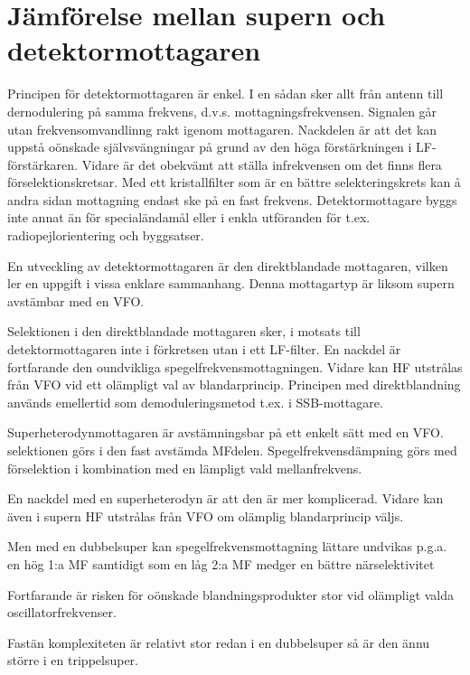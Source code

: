 \section{Jämförelse mellan supern och detektormottagaren}
\label{superheterojämförelse}

Principen för detektormottagaren är enkel. I en sådan sker allt från
antenn till dernodulering på samma frekvens,
d.v.s. mottagningsfrekvensen. Signalen går utan frekvensomvandlinng
rakt igenom mottagaren. Nackdelen är att det kan uppstå oönskade
självsvängningar på grund av den höga förstärkningen i
LF-förstärkaren. Vidare är det obekvämt att ställa infrekvensen om det
finns flera förselektionskretsar. Med ett kristallfilter som är en
bättre selekteringskrets kan å andra sidan mottagning endast ske på en
fast frekvens. Detektormottagare byggs inte annat än för
specialändamål eller i enkla utföranden för
t.ex. radiopejlorientering och byggsatser.

En utveckling av detektormottagaren är den direktblandade mottagaren,
vilken ler en uppgift i vissa enklare sammanhang.  Denna mottagartyp
är liksom supern avstämbar med en VFO.

Selektionen i den direktblandade mottagaren sker, i motsats till
detektormottagaren inte i förkretsen utan i ett LF-filter. En nackdel
är fortfarande den oundvikliga spegelfrekvensmottagningen. Vidare kan
HF utstrålas från VFO vid ett olämpligt val av
blandarprincip. Principen med direktblandning används emellertid som
demoduleringsmetod t.ex. i SSB-mottagare.

Superheterodynmottagaren är avstämningsbar på ett enkelt sätt med en
VFO.  selektionen görs i den fast avstämda
MFdelen. Spegelfrekvensdämpning görs med förselektion i kombination
med en lämpligt vald mellanfrekvens.

En nackdel med en superheterodyn är att den är mer komplicerad. Vidare
kan även i supern HF utstrålas från VFO om olämplig blandarprincip
väljs.

Men med en dubbelsuper kan spegelfrekvensmottagning lättare undvikas
p.g.a.  en hög 1:a MF samtidigt som en låg 2:a MF medger en bättre
närselektivitet

Fortfarande är risken för oönskade blandningsprodukter stor vid
olämpligt valda oscillatorfrekvenser.

Fastän komplexiteten är relativt stor redan i en dubbelsuper så är den
ännu större i en trippelsuper.
